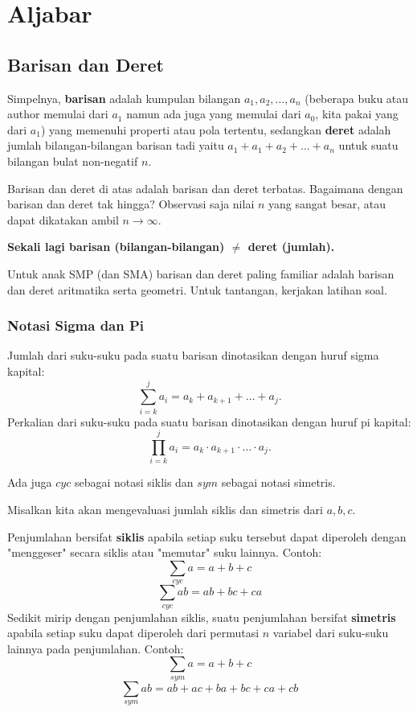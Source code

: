 \graphicspath{{./}}

\section{Aljabar}
    \subsection{Barisan dan Deret}
    Simpelnya, \textbf{barisan} adalah kumpulan bilangan $a_1,a_2,\dots,a_n$ (beberapa buku atau author memulai dari $a_1$ namun ada juga yang memulai dari $a_0$, kita pakai yang dari $a_1$) yang memenuhi properti atau pola tertentu, sedangkan \textbf{deret} adalah jumlah bilangan-bilangan barisan tadi yaitu $a_1+a_1+a_2+\dots+a_n$ untuk suatu bilangan bulat non-negatif $n$.
    
    Barisan dan deret di atas adalah barisan dan deret terbatas. Bagaimana dengan barisan dan deret tak hingga? Observasi saja nilai $n$ yang sangat besar, atau dapat dikatakan ambil $n \rightarrow \infty.$
    
    \textbf{Sekali lagi barisan (bilangan-bilangan) $\neq$ deret (jumlah).}
    
    Untuk anak SMP (dan SMA) barisan dan deret paling familiar adalah barisan dan deret aritmatika serta geometri. Untuk tantangan, kerjakan latihan soal.
    
    \subsubsection{Notasi Sigma dan Pi}
    Jumlah dari suku-suku pada suatu barisan dinotasikan dengan huruf sigma kapital:
    $$\sum_{i=k}^{j} a_i = a_k+a_{k+1}+\dots+a_j.$$
    Perkalian dari suku-suku pada suatu barisan dinotasikan dengan huruf pi kapital:
    $$\prod_{i=k}^{j} a_i = a_k \cdot a_{k+1}\cdot \ldots \cdot a_j.$$
    
    Ada juga $cyc$ sebagai notasi siklis dan $sym$ sebagai notasi simetris.
    
    Misalkan kita akan mengevaluasi jumlah siklis dan simetris dari $a,b,c$.
    
    Penjumlahan bersifat \textbf{siklis} apabila setiap suku tersebut dapat diperoleh dengan "menggeser" secara siklis atau "memutar" suku lainnya.
    Contoh: $$\sum_{cyc} a = a+b+c$$
         $$\sum_{cyc} ab = ab+ bc + ca$$
    Sedikit mirip dengan penjumlahan siklis, suatu penjumlahan bersifat \textbf{simetris} apabila setiap suku dapat diperoleh dari permutasi $n$ variabel dari suku-suku lainnya pada penjumlahan. Contoh: 
        $$\sum_{sym} a = a+b+c$$
        $$\sum_{sym} ab = ab+ ac + ba + bc + ca + cb$$
    
